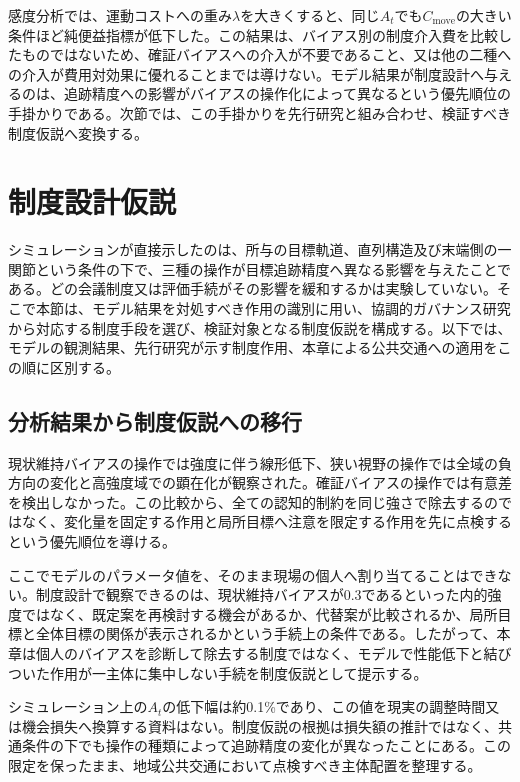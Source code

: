 感度分析では、運動コストへの重み$\lambda$を大きくすると、同じ$A_t$でも$C_{\mathrm{move}}$の大きい条件ほど純便益指標が低下した。この結果は、バイアス別の制度介入費を比較したものではないため、確証バイアスへの介入が不要であること、又は他の二種への介入が費用対効果に優れることまでは導けない。モデル結果が制度設計へ与えるのは、追跡精度への影響がバイアスの操作化によって異なるという優先順位の手掛かりである。次節では、この手掛かりを先行研究と組み合わせ、検証すべき制度仮説へ変換する。

\section{制度設計仮説}
\label{sec:ch3_design}

シミュレーションが直接示したのは、所与の目標軌道、直列構造及び末端側の一関節という条件の下で、三種の操作が目標追跡精度へ異なる影響を与えたことである。どの会議制度又は評価手続がその影響を緩和するかは実験していない。そこで本節は、モデル結果を対処すべき作用の識別に用い、協調的ガバナンス研究から対応する制度手段を選び、検証対象となる制度仮説を構成する。以下では、モデルの観測結果、先行研究が示す制度作用、本章による公共交通への適用をこの順に区別する。

\subsection{分析結果から制度仮説への移行}

現状維持バイアスの操作では強度に伴う線形低下、狭い視野の操作では全域の負方向の変化と高強度域での顕在化が観察された。確証バイアスの操作では有意差を検出しなかった。この比較から、全ての認知的制約を同じ強さで除去するのではなく、変化量を固定する作用と局所目標へ注意を限定する作用を先に点検するという優先順位を導ける。

ここでモデルのパラメータ値を、そのまま現場の個人へ割り当てることはできない。制度設計で観察できるのは、現状維持バイアスが0.3であるといった内的強度ではなく、既定案を再検討する機会があるか、代替案が比較されるか、局所目標と全体目標の関係が表示されるかという手続上の条件である。したがって、本章は個人のバイアスを診断して除去する制度ではなく、モデルで性能低下と結びついた作用が一主体に集中しない手続を制度仮説として提示する。

シミュレーション上の$A_t$の低下幅は約0.1\%であり、この値を現実の調整時間又は機会損失へ換算する資料はない。制度仮説の根拠は損失額の推計ではなく、共通条件の下でも操作の種類によって追跡精度の変化が異なったことにある。この限定を保ったまま、地域公共交通において点検すべき主体配置を整理する。

